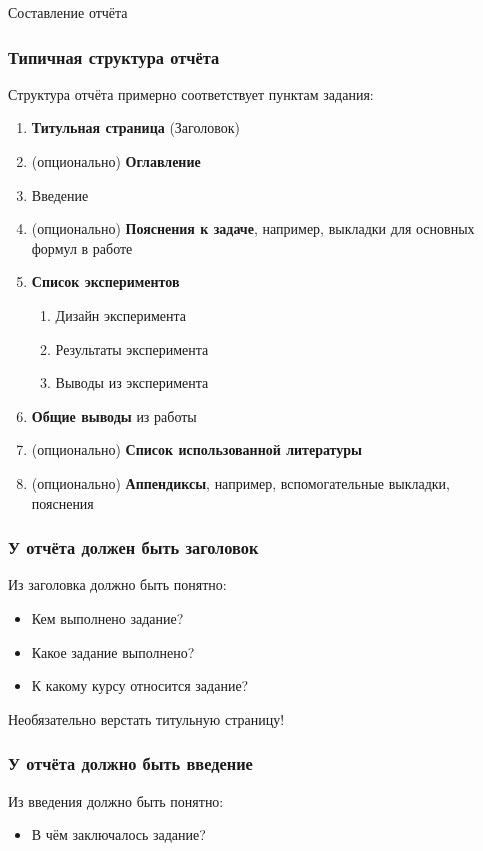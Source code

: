 \documentclass[fleqn, xcolor=x11names]{beamer}
\begin{document}
\begin{section}{Составление отчёта}

\begin{frame}[fragile]\frametitle{Типичная структура отчёта}
	Структура отчёта примерно соответствует пунктам задания:

	\begin{enumerate}
		\item \textbf{Титульная страница} (Заголовок)
		\item (опционально) \textbf{Оглавление}
		\item Введение
		\item (опционально) \textbf{Пояснения к задаче}, например, выкладки для основных формул в работе
		\item \textbf{Список экспериментов}
		\begin{enumerate}
			\item Дизайн эксперимента
			\item Результаты эксперимента
			\item Выводы из эксперимента
		\end{enumerate}
		\item \textbf{Общие выводы} из работы
		\item (опционально) \textbf{Список использованной литературы}
		\item (опционально) \textbf{Аппендиксы}, например, вспомогательные выкладки, пояснения
	\end{enumerate}

\end{frame}

\begin{frame}[fragile]\frametitle{У отчёта должен быть \textbf{заголовок}}
Из заголовка должно быть понятно:
\begin{itemize}
    \item Кем выполнено задание?
    \item Какое задание выполнено?
    \item К какому курсу относится задание?
\end{itemize}

\hfill

Необязательно верстать титульную страницу!

\hfill


\end{frame}

\begin{frame}[fragile]\frametitle{У отчёта должно быть \textbf{введение}}
Из введения должно быть понятно:
\begin{itemize}
    \item В чём заключалось задание?
\end{itemize}


\end{frame}
\end{section}
\end{document}

